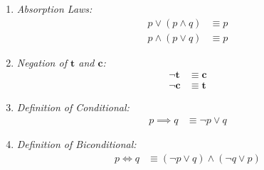 \documentclass[12pt,letterpaper]{article}
\newcommand{\taut}{\mathbf{t}}
\newcommand{\cont}{\mathbf{c}}
\newcommand{\logicalRule}[2]{
    \textit{#1}
    \begin{align*}
        #2
    \end{align*}
}
\begin{document}
\begin{enumerate}[1.]
    \item
    \logicalRule{Absorption Laws:}{
        p \lor  (p \land q) &\equiv p \\
        p \land (p \lor  q) &\equiv p
    }

    \item
    \logicalRule{Negation of $\taut$ and $\cont$:}{
        \lnot\taut &\equiv \cont \\
        \lnot\cont &\equiv \taut
    }

    \item
    \logicalRule{Definition of Conditional:}{
        p \implies q &\equiv \lnot p \lor q
    }

    \item
    \logicalRule{Definition of Biconditional:}{
        p \iff q &\equiv (\lnot p \lor q) \land (\lnot q \lor p)
    }
\end{enumerate}
\end{document}
